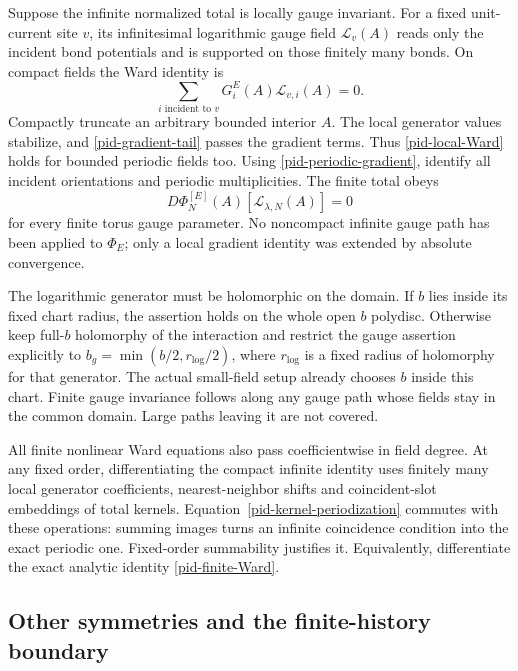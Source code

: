 Suppose the infinite normalized total is locally gauge invariant.
For a fixed unit-current site $v$, its infinitesimal logarithmic
gauge field $\mathcal L_v(A)$ reads only the incident bond
potentials and is supported on those finitely many bonds.
On compact fields the Ward identity is
\begin{equation}
 \sum_{i\text{ incident to }v}
                    G_i^E(A)\mathcal L_{v,i}(A)=0.
 \label{pid-local-Ward}
\end{equation}
Compactly truncate an arbitrary bounded interior $A$. The local
generator values stabilize, and \eqref{pid-gradient-tail}
passes the gradient terms. Thus \eqref{pid-local-Ward} holds
for bounded periodic fields too. Using
\eqref{pid-periodic-gradient}, identify all incident orientations
and periodic multiplicities. The finite total obeys
\begin{equation}
 D\Phi_N^{[E]}(A)[\mathcal L_{\lambda,N}(A)]=0
 \label{pid-finite-Ward}
\end{equation}
for every finite torus gauge parameter. No noncompact infinite
gauge path has been applied to $\Phi_E$; only a local gradient
identity was extended by absolute convergence.

The logarithmic generator must be holomorphic on the domain.
If $b$ lies inside its fixed chart radius, the assertion holds
on the whole open $b$ polydisc. Otherwise keep full-$b$
holomorphy of the interaction and restrict the gauge assertion
explicitly to $b_g=\min(b/2,r_{\log}/2)$, where $r_{\log}$ is
a fixed radius of holomorphy for that generator. The actual
small-field setup already chooses $b$ inside this chart. Finite
gauge invariance follows along any gauge path whose fields stay
in the common domain. Large paths leaving it are not covered.

All finite nonlinear Ward equations also pass coefficientwise
in field degree. At any fixed order, differentiating the compact
infinite identity uses finitely many local generator coefficients,
nearest-neighbor shifts and coincident-slot embeddings of total
kernels. Equation~\eqref{pid-kernel-periodization} commutes with
these operations: summing images turns an infinite coincidence
condition into the exact periodic one. Fixed-order summability
justifies it. Equivalently, differentiate the exact analytic
identity \eqref{pid-finite-Ward}.

\subsection{Other symmetries and the finite-history boundary}
\label{pid-scope-section}


